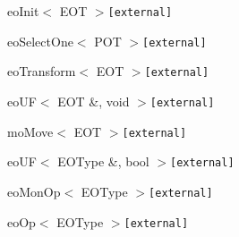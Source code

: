 \begin{CompactList}
\begin{CompactList}
\begin{CompactList}
\begin{CompactList}
\item {}
\item {}
\end{CompactList}
\item eo\-Init$<$ EOT $>${\tt  \mbox{[}external\mbox{]}}\begin{CompactList}
\item {}
\end{CompactList}
\item eo\-Select\-One$<$ POT $>${\tt  \mbox{[}external\mbox{]}}\begin{CompactList}
\item {}
\end{CompactList}
\item eo\-Transform$<$ EOT $>${\tt  \mbox{[}external\mbox{]}}\begin{CompactList}
\item {}
\end{CompactList}
\end{CompactList}
\item eo\-UF$<$ EOT \&, void $>${\tt  \mbox{[}external\mbox{]}}\begin{CompactList}
\item mo\-Move$<$ EOT $>${\tt  \mbox{[}external\mbox{]}}\begin{CompactList}
\item {}
\end{CompactList}
\end{CompactList}
\item eo\-UF$<$ EOType \&, bool $>${\tt  \mbox{[}external\mbox{]}}\begin{CompactList}
\item eo\-Mon\-Op$<$ EOType $>${\tt  \mbox{[}external\mbox{]}}\begin{CompactList}
\item {}
\end{CompactList}
\end{CompactList}
\end{CompactList}
\item eo\-Op$<$ EOType $>${\tt  \mbox{[}external\mbox{]}}\begin{CompactList}

\end{CompactList}
\end{CompactList}
